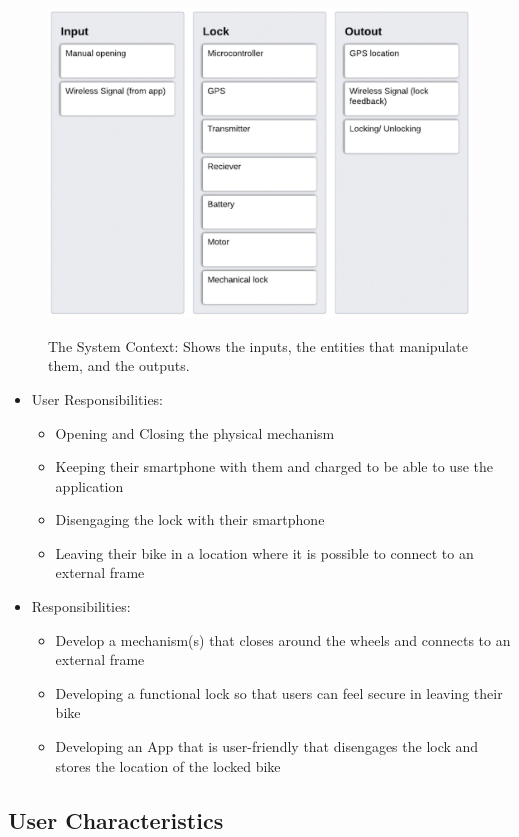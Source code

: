\documentclass[12pt]{article}
\begin{document}
 \begin{figure}[h!]
 \begin{center}
 {
  \includegraphics[width=0.6\linewidth]{../SystemContextDiagram.jpeg}
 }
 \caption{\label{The System Context}The System Context: Shows the inputs, the entities that manipulate them, and the outputs.}
 \end{center}
 \end{figure}

\begin{itemize}
\item User Responsibilities:
\begin{itemize}
\item Opening and Closing the physical mechanism
\item Keeping their smartphone with them and charged to be able to use the application
\item Disengaging the lock with their smartphone
\item Leaving their bike in a location where it is possible to connect to an external frame
\end{itemize}
\item \progname{} Responsibilities:
\begin{itemize}
\item Develop a mechanism(s) that closes around the wheels and connects to an external frame
\item Developing a functional lock so that users can feel secure in leaving their bike
\item Developing an App that is user-friendly that disengages the lock and stores the location of the locked bike
\end{itemize}
\end{itemize}

\subsection{User Characteristics} \label{SecUserCharacteristics}
\end{document}
